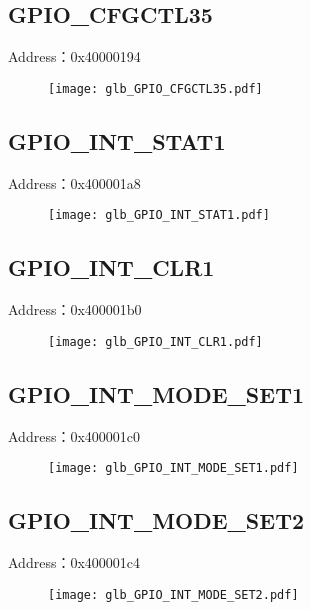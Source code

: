 \subsection{GPIO\_CFGCTL35}
\label{glb-GPIO-CFGCTL35}
Address：0x40000194
 \begin{figure}[H]
\texttt{[image: glb\_GPIO\_CFGCTL35.pdf]}
\end{figure}

\subsection{GPIO\_INT\_STAT1}
\label{glb-GPIO-INT-STAT1}
Address：0x400001a8
 \begin{figure}[H]
\texttt{[image: glb\_GPIO\_INT\_STAT1.pdf]}
\end{figure}

\subsection{GPIO\_INT\_CLR1}
\label{glb-GPIO-INT-CLR1}
Address：0x400001b0
 \begin{figure}[H]
\texttt{[image: glb\_GPIO\_INT\_CLR1.pdf]}
\end{figure}

\subsection{GPIO\_INT\_MODE\_SET1}
\label{glb-GPIO-INT-MODE-SET1}
Address：0x400001c0
 \begin{figure}[H]
\texttt{[image: glb\_GPIO\_INT\_MODE\_SET1.pdf]}
\end{figure}

\subsection{GPIO\_INT\_MODE\_SET2}
\label{glb-GPIO-INT-MODE-SET2}
Address：0x400001c4
 \begin{figure}[H]
\texttt{[image: glb\_GPIO\_INT\_MODE\_SET2.pdf]}
\end{figure}

